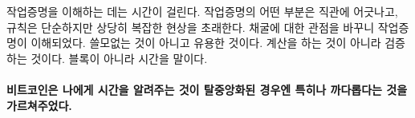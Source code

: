 \begin{comment}
	Understanding proof-of-work takes time. It is often counter-intuitive,
	and while the rules are simple, they lead to quite complex phenomena.
	For me, shifting my perspective on mining helped. Useful, not useless.
	Validation, not computation. Time, not blocks.
\end{comment}
작업증명을 이해하는 데는 시간이 걸린다.
작업증명의 어떤 부분은 직관에 어긋나고, 규칙은 단순하지만 상당히 복잡한 현상을 초래한다.
채굴에 대한 관점을 바꾸니 작업증명이 이해되었다.
쓸모없는 것이 아니고 유용한 것이다. 계산을 하는 것이 아니라 검증하는 것이다.
블록이 아니라 시간을 말이다.

\paragraph{비트코인은 나에게 시간을 알려주는 것이 탈중앙화된 경우엔 특히나 까다롭다는 것을 가르쳐주었다.}

%
%
%
%
%
%
%
